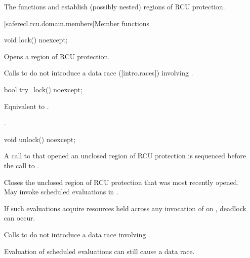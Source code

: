 The functions  and  establish (possibly nested)
regions of RCU protection.

[saferecl.rcu.domain.members]{Member functions}

\begin{itemdecl}
void lock() noexcept;
\end{itemdecl}

\begin{itemdescr}

\pnum
\effects
Opens a region of RCU protection.

\pnum
\remarks
Calls to  do not introduce a data race
([intro.races]) involving .

\end{itemdescr}

\begin{itemdecl}
bool try_lock() noexcept;
\end{itemdecl}

\begin{itemdescr}

\pnum
\effects
Equivalent to .

\pnum
\returns
{}.

\end{itemdescr}


\begin{itemdecl}
void unlock() noexcept;
\end{itemdecl}

\begin{itemdescr}

\pnum
\expects
A call to  that opened
an unclosed region of RCU protection is sequenced before the
call to .

\pnum
\effects
Closes the unclosed region of RCU protection that was
most recently opened.
May invoke scheduled evaluations in .

\pnum
\begin{note}
If such evaluations acquire resources held across any invocation
of  on , deadlock can occur.
\end{note}
Calls to  do not introduce a data race
involving .
\begin{note}
Evaluation of scheduled evaluations can still cause a data race.
\end{note}

\end{itemdescr}

